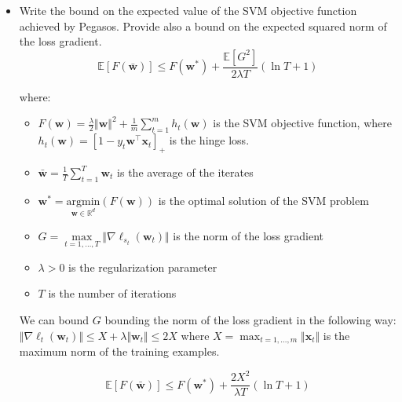\begin{itemize}
    \item Write the bound on the expected value of the SVM objective function achieved by Pegasos.
Provide also a bound on the expected squared norm of the loss gradient.\\
        
        $$
        \mathbb{E}\left[F(\bar{\boldsymbol{w}})\right] \leq F(\boldsymbol{w}^*) + \frac{\mathbb{E}\left[G^2\right]}{2 \lambda T} (\ln T + 1)
        $$
            
        where:
        \begin{itemize}
            \item $F(\boldsymbol{w}) = \frac{\lambda}{2} \Vert \boldsymbol{w} \Vert^2 + \frac{1}{m} \sum_{t = 1}^m h_{t}(\boldsymbol{w})$ is the SVM objective function, where $h_{t}(\boldsymbol{w}) = \left[1 - y_t \boldsymbol{w}^\top \boldsymbol{x}_t \right]_+$ is the hinge loss.
            \item $\bar{\boldsymbol{w}} = \frac{1}{T} \sum_{t = 1}^T \boldsymbol{w}_t$ is the average of the iterates
            \item $\boldsymbol{w}^* = \underset{\boldsymbol{w} \in \mathbb{R}^d}{\text{argmin}} (F(\boldsymbol{w}))$ is the optimal solution of the SVM problem
            \item $G = \underset{t=1,\dots,T}{\max} \Vert \nabla \ell_{s_t}(\boldsymbol{w}_t) \Vert$ is the norm of the loss gradient            
            \item $\lambda > 0$ is the regularization parameter
            \item $T$ is the number of iterations
        \end{itemize}
        
        We can bound $G$ bounding the norm of the loss gradient in the following way: $\Vert \nabla \ell_t(\boldsymbol{w}_t) \Vert \leq X + \lambda \Vert \boldsymbol{w}_t \Vert \leq 2X$ where $X = \max_{t = 1, \dots, m} \Vert \boldsymbol{x}_t \Vert$ is the maximum norm of the training examples.

        $$
    \mathbb{E}\left[F(\bar{\boldsymbol{w}})\right] \leq F(\boldsymbol{w}^*) + \frac{2 X^2}{\lambda T} (\ln T + 1)
        $$
\end{itemize}
